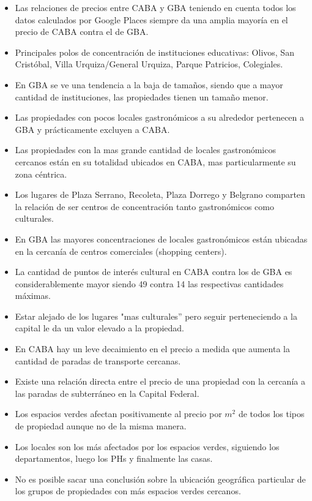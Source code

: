 \documentclass[a4paper, 10pt]{article}
\begin{document}
			\begin{itemize}
				\item Las relaciones de precios entre CABA y GBA teniendo en cuenta todos los datos calculados 
				por Google Places siempre da una amplia mayoría en el precio de CABA contra el de GBA.
				\item Principales polos de concentración de instituciones educativas: Olivos, San Cristóbal, 
				Villa Urquiza/General Urquiza, Parque Patricios, Colegiales.
				\item En GBA se ve una tendencia a la baja de tamaños, siendo que a mayor 
				cantidad de instituciones, las propiedades tienen un tamaño menor.
				\item Las propiedades con pocos locales gastronómicos a su alrededor pertenecen a 
				GBA y prácticamente excluyen a CABA.
				\item Las propiedades con la mas grande cantidad de locales gastronómicos 
				cercanos están en su totalidad ubicados en CABA, mas particularmente su zona céntrica.
				\item Los lugares de Plaza Serrano, Recoleta, Plaza Dorrego y Belgrano 
				comparten la relación de ser centros de concentración tanto gastronómicos como culturales.
				\item En GBA las mayores concentraciones de locales gastronómicos están ubicadas 
				en la cercanía de centros comerciales (shopping centers).
				\item La cantidad de puntos de interés cultural en CABA contra los de GBA es 
				considerablemente mayor siendo 49 contra 14 las respectivas cantidades máximas.
				\item Estar alejado de los lugares "mas culturales” pero seguir perteneciendo 
				a la capital le da un valor elevado a la propiedad.
				\item En CABA hay un leve decaimiento en el precio a medida que aumenta la 
				cantidad de paradas de transporte cercanas.
				\item Existe una relación directa entre el precio de una propiedad con 
				la cercanía a las paradas de subterráneo en la Capital Federal.
				\item Los espacios verdes afectan positivamente al precio por $m^2$ de todos los tipos de propiedad
				aunque no de la misma manera.
				\item Los locales son los más afectados por los espacios verdes, siguiendo los departamentos, luego los
				PHs y finalmente las casas.
				\item No es posible sacar una conclusión sobre la ubicación geográfica particular de los grupos de propiedades
				con más espacios verdes cercanos.
			\end{itemize}
\end{document}

